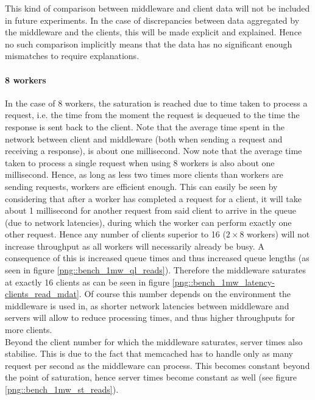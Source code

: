 \documentclass[11pt,a4paper]{article}
\begin{document}
This kind of comparison between middleware and client data will not be included in future experiments. In the case of discrepancies between data aggregated by the middleware and the clients, this will be made explicit and explained. Hence no such comparison implicitly means that the data has no significant enough mismatches to require explanations.

\paragraph{8 workers}
In the case of 8 workers, the saturation is reached due to time taken to process a request, i.e. the time from the moment the request is dequeued to the time the response is sent back to the client. Note that the average time spent in the network between client and middleware (both when sending a request and receiving a response), is about one millisecond. Now note that the average time taken to process a single request when using 8 workers is also about one millisecond. Hence, as long as less two times more clients than workers are sending requests, workers are efficient enough. This can easily be seen by considering that after a worker has completed a request for a client, it will take about 1 millisecond for another request from said client to arrive in the queue (due to network latencies), during which the worker can perform exactly one other request. Hence any number of clients superior to 16 ($2\times8$ workers) will not increase throughput as all workers will necessarily already be busy. A consequence of this is increased queue times and thus increased queue lengths (as seen in figure \ref{png::bench_1mw_ql_reads}). Therefore the middleware saturates at exactly 16 clients as can be seen in figure \ref{png::bench_1mw_latency-clients_read_mdat}. Of course this number depends on the environment the middleware is used in, as shorter network latencies between middleware and servers will allow to reduce processing times, and thus higher throughputs for more clients.\\
Beyond the client number for which the middleware saturates, server times also stabilise. This is due to the fact that memcached has to handle only as many request per second as the middleware can process. This becomes constant beyond the point of saturation, hence server times become constant as well (see figure \ref{png::bench_1mw_st_reads}).
\end{document}
